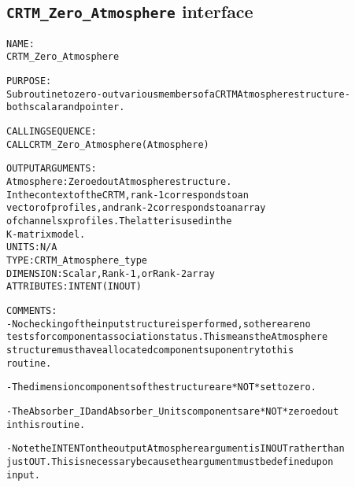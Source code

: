 \subsection{\texttt{CRTM\_Zero\_Atmosphere} interface}
  \label{sec:CRTM_Zero_Atmosphere_interface}
  \begin{alltt}
 
  NAME:
        CRTM_Zero_Atmosphere
  
  PURPOSE:
        Subroutine to zero-out various members of a CRTM Atmosphere structure -
        both scalar and pointer.
 
  CALLING SEQUENCE:
        CALL CRTM_Zero_Atmosphere( Atmosphere )
 
  OUTPUT ARGUMENTS:
        Atmosphere:   Zeroed out Atmosphere structure.
                      In the context of the CRTM, rank-1 corresponds to an
                      vector of profiles, and rank-2 corresponds to an array
                      of channels x profiles. The latter is used in the
                      K-matrix model.
                      UNITS:      N/A
                      TYPE:       CRTM_Atmosphere_type
                      DIMENSION:  Scalar, Rank-1, or Rank-2 array
                      ATTRIBUTES: INTENT(IN OUT)
 
  COMMENTS:
        - No checking of the input structure is performed, so there are no
          tests for component association status. This means the Atmosphere
          structure must have allocated components upon entry to this
          routine.
 
        - The dimension components of the structure are *NOT* set to zero.
 
        - The Absorber_ID and Absorber_Units components are *NOT* zeroed out
          in this routine.
 
        - Note the INTENT on the output Atmosphere argument is IN OUT rather than
          just OUT. This is necessary because the argument must be defined upon
          input.
 
  \end{alltt}
